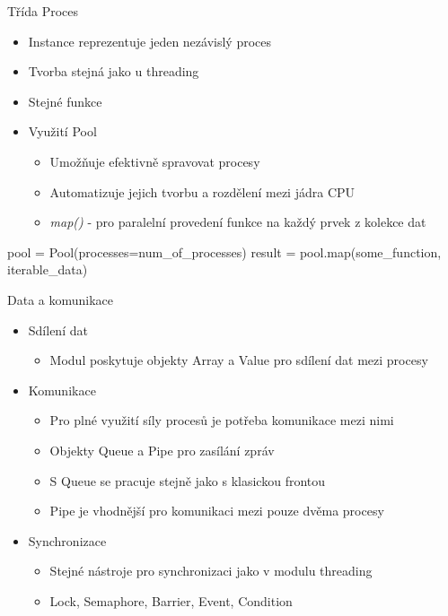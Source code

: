 \documentclass{beamer}
\begin{document}
\begin{frame}[fragile]{Třída Proces}
    \begin{itemize}
        \item Instance reprezentuje jeden nezávislý proces
        \item Tvorba stejná jako u threading
        \item Stejné funkce
        \vskip 0.25in

        \item Využití Pool
        \begin{itemize}
            \item Umožňuje efektivně spravovat procesy
            \item Automatizuje jejich tvorbu a rozdělení mezi jádra CPU
            \item \textit{map()} - pro paralelní provedení funkce na každý prvek z kolekce dat
        \end{itemize}
    \end{itemize}
    \scriptsize
    \begin{semiverbatim}
    pool = Pool(processes=num_of_processes) 
    result = pool.map(some_function, iterable_data)
    \end{semiverbatim}  
\end{frame}

\begin{frame}{Data a komunikace}
    \begin{itemize}
        \item Sdílení dat
        \begin{itemize}
            \item Modul poskytuje objekty Array a Value pro sdílení dat mezi procesy
        \end{itemize}

        \item Komunikace
        \begin{itemize}
            \item Pro plné využití síly procesů je potřeba komunikace mezi nimi
            \item Objekty Queue a Pipe pro zasílání zpráv
            \item S Queue se pracuje stejně jako s klasickou frontou
            \item Pipe je vhodnější pro komunikaci mezi pouze dvěma procesy
        \end{itemize}
        \item Synchronizace
        \begin{itemize}
            \item Stejné nástroje pro synchronizaci jako v modulu threading
            \item Lock, Semaphore, Barrier, Event, Condition
        \end{itemize}
    \end{itemize}
\end{frame}
\end{document}
